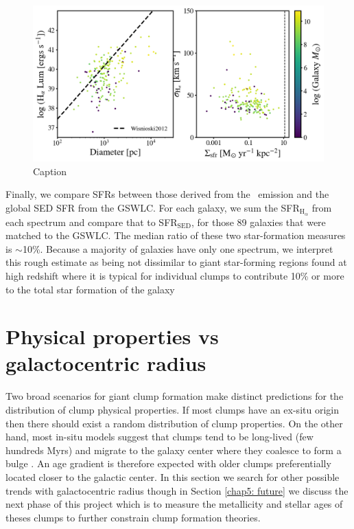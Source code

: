 \begin{figure}
\includegraphics[width=\textwidth]{Figures/clump_relations.png}
\caption[Clump properties: $L(\mathrm{H}_{\alpha})$ vs size and $\sigma_{H_{\alpha}}$ vs $\Sigma_{SFR}$]{Caption}
\label{fig: clump scatter plots}
\end{figure}

Finally, we compare SFRs between those derived from the \ha~emission and the global SED SFR from the GSWLC. For each galaxy, we sum the SFR$_{\mathrm{H}_{\alpha}}$ from each spectrum and compare that to SFR$_{\mathrm{SED}}$, for those 89 galaxies that were matched to the GSWLC. The median ratio of these two star-formation measures is $\sim$10\%. Because a majority of galaxies have only one spectrum, we interpret this rough estimate as being not dissimilar to giant star-forming regions found at high redshift where it is typical for individual clumps to contribute 10\% or more to the total star formation of the galaxy \citep{Genzel2011, Guo2012, Wisnioski2012}






\section{Physical properties vs galactocentric radius}
\label{chap5: galactocentric radius}

Two broad scenarios for giant clump formation make distinct predictions for the distribution of clump physical properties. If most clumps have an ex-situ origin then there should exist a random distribution of clump properties. On the other hand, most in-situ models suggest that clumps tend to be long-lived (few hundreds Myrs) and migrate to the galaxy center where they coalesce to form a bulge \citep{Bournaud2016}. An age gradient is therefore expected with older clumps preferentially located closer to the galactic center. In this section we search for other possible trends with galactocentric radius though in Section \ref{chap5: future} we discuss the next phase of this project which is to measure the metallicity and stellar ages of theses clumps to further constrain clump formation theories. 


